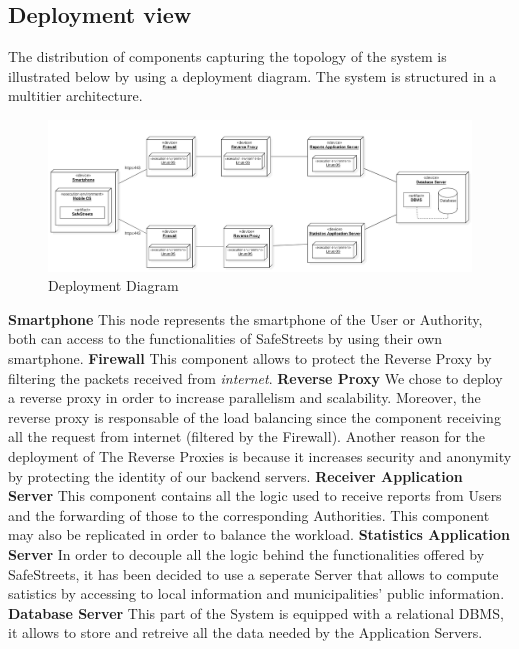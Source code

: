 \subsection{Deployment view}
The distribution of components capturing the topology of the system is illustrated below by using a deployment diagram.\newline
The system is structured in a multitier architecture.
\newline
\begin{figure}[H]
          \includegraphics[width=1.25\textwidth,left]{Images/deployment_diagram.png}
        \caption{Deployment Diagram}
\end{figure}
\noindent\textbf{Smartphone}\newline
This node represents the smartphone of the User or Authority, both can access to the functionalities of SafeStreets by using their own smartphone.
\newline
\textbf{Firewall}\newline
This component allows to protect the Reverse Proxy by filtering the packets received from \textit{internet}.
\newline
\textbf{Reverse Proxy}\newline
We chose to deploy a reverse proxy in order to increase parallelism and scalability. Moreover, the reverse proxy is responsable of the load balancing since the component receiving all the request from internet (filtered by the Firewall). Another reason for the deployment of The Reverse Proxies is because it increases security and anonymity by protecting the identity of our backend servers.
\newline
\textbf{Receiver Application Server}\newline
This component contains all the logic used to receive reports from Users and the forwarding of those to the corresponding Authorities. This component may also be replicated in order to balance the workload.
\newline
\textbf{Statistics Application Server}\newline
In order to decouple all the logic behind the functionalities offered by SafeStreets, it has been decided to use a seperate Server that allows to compute satistics by accessing to local information and municipalities' public information.
\newline
\textbf{Database Server}\newline
This part of the System is equipped with a relational DBMS, it allows to store and retreive all the data needed by the Application Servers.

